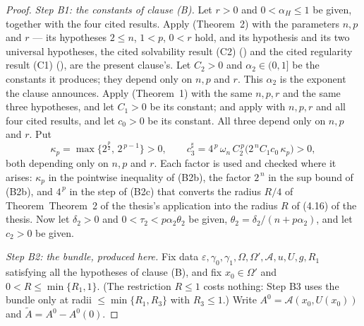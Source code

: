 \begin{proof}
\emph{Step B1: the constants of clause (B).}  Let $r>0$ and $0<\alpha_H\le1$ be
given, together with the four cited results.  Apply
 (Theorem~2) with the parameters $n,p$ and
$r$ --- its hypotheses $2\le n$, $1<p$, $0<r$ hold, and its hypothesis
 and its two universal hypotheses, the cited
solvability result (C2) () and the cited regularity
result (C1) (), are the present clause's.  Let
$C_2>0$ and $\alpha_2\in(0,1]$ be the constants it produces; they depend only on
$n,p$ and $r$.  This $\alpha_2$ is the exponent the clause announces.  Apply
 (Theorem~1) with the same $n,p,r$ and the same
three hypotheses, and let $C_1>0$ be its constant; and apply
 with $n,p,r$ and all four cited results, and let
$c_0>0$ be its constant.  All three depend only on $n,p$ and $r$.  Put
\[
\kappa_p=\max\bigl\{2^{\frac p2},\,2^{\,p-1}\bigr\}>0,
\qquad
c_3^{\sharp}=4^{\,p}\,\omega_n\,C_2^{\,p}\bigl(2^{\,n}C_1c_0\,\kappa_p\bigr)>0,
\]
both depending only on $n,p$ and $r$.  Each factor is used and checked where it
arises: $\kappa_p$ in the pointwise inequality of (B2b), the factor $2^{\,n}$ in
the sup bound of (B2b), and $4^{\,p}$ in the step of (B2c) that converts the
radius $R/4$ of Theorem~Theorem~2 of the thesis's application into the radius $R$ of
(4.16) of the thesis.  Now let $\delta_2>0$ and
$0<\tau_2<p\alpha_2\theta_2$ be given, $\theta_2=\delta_2/(n+p\alpha_2)$, and
let $c_2>0$ be given.

\emph{Step B2: the bundle, produced here.}  Fix data
$\varepsilon,\gamma_0,\gamma_1,\Omega,\Omega',\mathcal A,u,U,g,R_1$ satisfying
all the hypotheses of clause (B), and fix $x_0\in\Omega'$ and
$0<R\le\min\{R_1,1\}$.  (The restriction $R\le1$ costs nothing: Step B3 uses
the bundle only at radii $\le\min\{R_1,R_3\}$ with $R_3\le1$.)
Write $A^0=\mathcal A(x_0,U(x_0))$ and $\widetilde A=A^0-A^0(0)$.


\end{proof}
